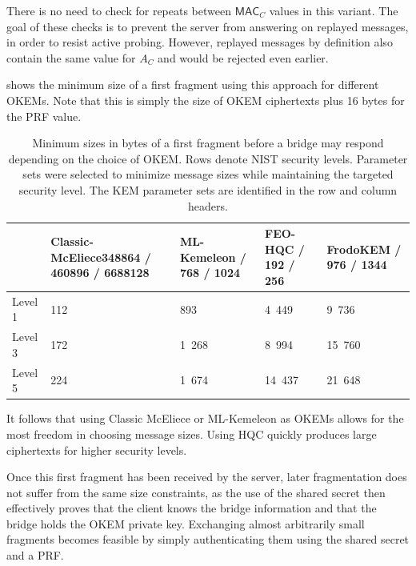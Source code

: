 There is no need to check for repeats between $\mathsf{MAC}_C$ values in this variant. The goal of these checks is to prevent the server from answering on replayed messages, in order to resist active probing.
However, replayed messages by definition also contain the same value for $A_C$ and would be rejected even earlier.

 shows the minimum size of a first fragment using this approach for different OKEMs. Note that this is simply the size of OKEM ciphertexts plus 16 bytes for the PRF value.

\begin{table}
    \centering \small
    \begin{tabular}{@{} L{0.1\textwidth-\tabcolsep} | R{0.3\tabcolsep} R{0.2\tabcolsep} R{0.2\tabcolsep} R{0.2\textwidth-\tabcolsep} @{}}
        & Classic-McEliece\newline \footnotesize 348864 / 460896 / 6688128
        & ML-Kemeleon / 768 / 1024
        & FEO-HQC / 192 / 256
        & FrodoKEM / 976 / 1344
        \\ \hline
    Level 1 & 112 & 893 & 4~449 & 9~736 \\
    Level 3 & 172 & 1~268 & 8~994 & 15~760 \\
    Level 5 & 224 & 1~674 & 14~437 & 21~648
    \end{tabular}
    \caption[
        Minimum sizes in bytes of a first fragment before a bridge may respond depending on the choice of OKEM.
    ]{
        Minimum sizes in bytes of a first fragment before a bridge may respond depending on the choice of OKEM. Rows denote NIST security levels. Parameter sets were selected to minimize message sizes while maintaining the targeted security level. The KEM parameter sets are identified in the row and column headers.
    }
    \label{tab:frag-min-needed}
\end{table}

It follows that using Classic McEliece or ML-Kemeleon as OKEMs allows for the most freedom in choosing message sizes. Using HQC quickly produces large ciphertexts for higher security levels.

Once this first fragment has been received by the server, later fragmentation does not suffer from the same size constraints, as the use of the shared secret then effectively proves that the client knows the bridge information and that the bridge holds the OKEM private key. Exchanging almost arbitrarily small fragments becomes feasible by simply authenticating them using the shared secret and a PRF.

